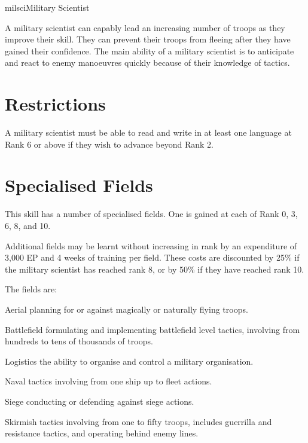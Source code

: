 \begin{Skill}[2.1]{milsci}{Military Scientist}

A military scientist can capably lead an increasing number of troops
as they improve their skill. They can prevent their troops from
fleeing after they have gained their confidence. The main ability of a
military scientist is to anticipate and react to enemy manoeuvres
quickly because of their knowledge of tactics.

\section{Restrictions}

A military scientist must be able to read and write in at least one
language at Rank 6 or above if they wish to advance beyond Rank 2.

\section{Specialised Fields}

This skill has a number of specialised fields. One is gained at each
of Rank 0, 3, 6, 8, and 10.

Additional fields may be learnt without increasing in rank by an
expenditure of 3,000 EP and 4 weeks of training per field. These costs
are discounted by 25\% if the military scientist has reached rank 8,
or by 50\% if they have reached rank 10.

The fields are:
\begin{Description}

\item[Aerial] planning for or against magically or naturally flying
  troops.

\item[Battlefield] formulating and implementing battlefield level
  tactics, involving from hundreds to tens of thousands of troops.

\item[Logistics] the ability to organise and control a military
  organisation.

\item[Naval] tactics involving from one ship up to fleet actions.

\item[Siege] conducting or defending against siege actions.

\item[Skirmish] tactics involving from one to fifty troops, includes
  guerrilla and resistance tactics, and operating behind enemy lines.


\end{Description}
\end{Skill}
